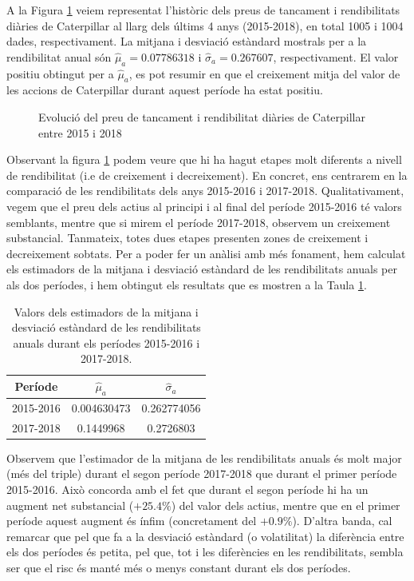 \documentclass{article}
\numberwithin{table}{section}
\numberwithin{figure}{section}
\numberwithin{equation}{section}
\begin{document}
A la Figura \ref{fig:serie preus} veiem representat l'històric dels preus de tancament i rendibilitats diàries de Caterpillar al llarg dels últims 4 anys (2015-2018), en total 1005 i 1004 dades, respectivament. La mitjana i desviació estàndard mostrals per a la rendibilitat anual són $\hat{\mu}_a=0.07786318$ i $\hat{\sigma}_a=0.267607$, respectivament. El valor positiu obtingut per a $\hat{\mu}_a$, es pot resumir en que el creixement mitja del valor de les accions de Caterpillar durant aquest període ha estat positiu.
\begin{figure}[H]
	\centering \sffamily \small
	
	\caption{Evolució del preu de tancament i rendibilitat diàries de Caterpillar entre 2015 i 2018}
	\label{fig:serie preus}
\end{figure}

Observant la figura \ref{fig:serie preus} podem veure que hi ha hagut etapes molt diferents a nivell de rendibilitat (i.e de creixement i decreixement). En concret, ens centrarem en la comparació de les rendibilitats dels anys 2015-2016 i 2017-2018.
Qualitativament, vegem que el preu dels actius al principi i al final del període 2015-2016 té valors semblants, mentre que si mirem el període 2017-2018, observem un creixement substancial. Tanmateix, totes dues etapes presenten zones de creixement i decreixement sobtats. Per a poder fer un anàlisi amb més fonament, hem calculat els estimadors de la  mitjana i desviació estàndard de les rendibilitats anuals per als dos períodes, i hem obtingut els resultats que es mostren a la Taula \ref{tb:estim}.

\begin{table}[H]
	\centering
	\caption{Valors dels estimadors de la mitjana i desviació estàndard de les rendibilitats anuals durant els períodes 2015-2016 i 2017-2018.}
	\begin{tabular}{|c|c|c|}
		\hline
		Període   & $\hat{\mu}_a$& $\hat{\sigma}_a$      \\ \hline
		2015-2016 & 0.004630473 & 0.262774056 \\ \hline
		2017-2018 & 0.1449968   & 0.2726803   \\ \hline
	\end{tabular}
	\label{tb:estim}
\end{table}

Observem que l'estimador de la mitjana de les rendibilitats anuals és molt major (més del triple) durant el segon període 2017-2018 que durant el primer període 2015-2016. Això concorda amb el fet que durant el segon període hi ha un augment net substancial ($+25.4\%$) del valor dels actius, mentre que en el primer període aquest augment és ínfim (concretament del $+0.9\%$). D'altra banda, cal remarcar que pel que fa a la desviació estàndard (o volatilitat) la diferència entre els dos períodes és petita, pel que, tot i les diferències en les rendibilitats, sembla ser que el risc és manté més o menys constant durant els dos períodes.
\end{document}

